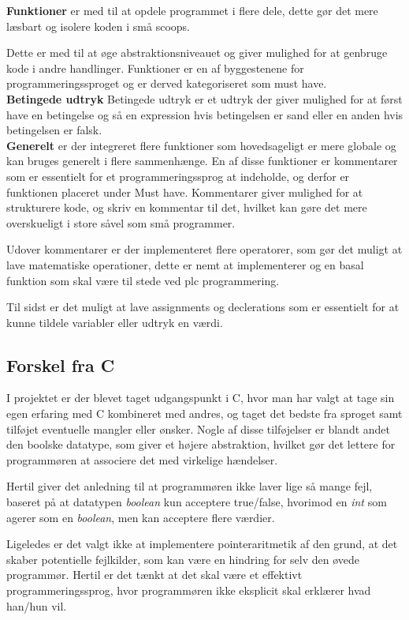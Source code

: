 \noindent\textbf{Funktioner}
er med til at opdele programmet i flere dele, dette gør det mere læsbart og isolere koden i små scoops.

Dette er med til at øge abstraktionsniveauet og giver mulighed for at genbruge kode i andre handlinger.
Funktioner er en af byggestenene for programmeringssproget og er derved kategoriseret som must have.\\

\noindent\textbf{Betingede udtryk}
Betingede udtryk er et udtryk der giver mulighed for at først have en betingelse og så en expression hvis betingelsen er sand eller en anden hvis betingelsen er falsk.\\

\noindent\textbf{Generelt} er der integreret flere funktioner som hovedsageligt er mere globale og kan bruges generelt i flere sammenhænge. En af disse funktioner er kommentarer som er essentielt for et programmeringssprog at indeholde, og derfor er funktionen placeret under Must have. Kommentarer giver mulighed for at strukturere kode, og skriv en kommentar til det, hvilket kan gøre det mere overskueligt i store såvel som små programmer.

Udover kommentarer er der implementeret flere operatorer, som gør det muligt at lave matematiske operationer, dette er nemt at implementerer og en basal funktion som skal være til stede ved \gls{plc} programmering.

Til sidst er det muligt at lave assignments og declerations som er essentielt for at kunne tildele variabler eller udtryk en værdi.

\subsection{Forskel fra C}
\label{sec:forskelfrac}
I projektet er der blevet taget udgangspunkt i C, hvor man har valgt at tage sin egen erfaring med C kombineret med andres, og taget det bedste fra sproget samt tilføjet eventuelle mangler eller ønsker.
Nogle af disse tilføjelser er blandt andet den boolske datatype, som giver et højere abstraktion, hvilket gør det  lettere for programmøren at associere det med virkelige hændelser.

Hertil giver det anledning til at programmøren ikke laver lige så mange fejl, baseret på at datatypen \textit{boolean} kun acceptere true/false, hvorimod en \textit{int} som agerer som en \textit{boolean}, men kan acceptere flere værdier.

Ligeledes er det valgt ikke at implementere pointeraritmetik af den grund, at det skaber potentielle fejlkilder, som kan være en hindring for selv den øvede programmør. Hertil er det tænkt at det skal være et effektivt programmeringssprog, hvor programmøren ikke eksplicit skal erklærer hvad han/hun vil.

